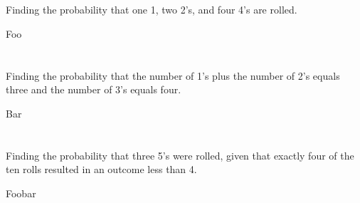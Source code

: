 \documentclass[hwnumber=4,studentnumber=20053722]{mthe353answer}
\begin{document}
  \begin{questions}
    \setcounter{question}{0}
    \question{}\noindent
    \begin{parts}
      \part{}
      Finding the probability that one 1, two 2's, and four 4's are rolled.
      \begin{solution}
        Foo
      \end{solution}
      \part{}
      Finding the probability that the number of 1’s plus the number of 2’s
      equals three and the number of 3’s equals four.
      \begin{solution}
        Bar
      \end{solution}
      \part{}
      Finding the probability that three 5’s were rolled, given that exactly
      four of the ten rolls resulted in an outcome less than 4.
      \begin{solution}
        Foobar
      \end{solution}
    \end{parts}
  \end{questions}
\end{document}
